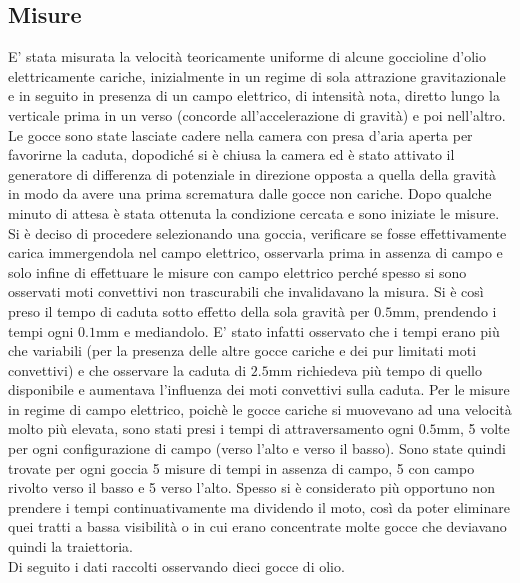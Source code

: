 \documentclass{article}
\begin{document}
\subsection{Misure}
    E' stata misurata la velocità teoricamente uniforme di alcune goccioline d’olio elettricamente cariche, inizialmente in un regime di sola attrazione gravitazionale e in seguito in presenza di un campo elettrico, di intensità nota, diretto lungo la verticale prima in un verso (concorde all'accelerazione di gravità) e poi nell'altro. \\
    Le gocce sono state lasciate cadere nella camera con presa d'aria aperta per favorirne la caduta, dopodiché si è chiusa la camera ed è stato attivato il generatore di differenza di potenziale in direzione opposta a quella della gravità in modo da avere una prima scrematura dalle gocce non cariche. Dopo qualche minuto di attesa è stata ottenuta la condizione cercata e sono iniziate le misure. \\
    Si è deciso di procedere selezionando una goccia, verificare se fosse effettivamente carica immergendola nel campo elettrico, osservarla prima in assenza di campo e solo infine di effettuare le misure con campo elettrico perché spesso si sono osservati moti convettivi non trascurabili che invalidavano la misura. Si è così preso il tempo di caduta sotto effetto della sola gravità per $0.5$mm, prendendo i tempi ogni $0.1$mm e mediandolo. E' stato infatti osservato che i tempi erano più che variabili (per la presenza delle altre gocce cariche e dei pur limitati moti convettivi) e che osservare la caduta di $2.5$mm richiedeva più tempo di quello disponibile e aumentava l'influenza dei moti convettivi sulla caduta. Per le misure in regime di campo elettrico, poichè le gocce cariche si muovevano ad una velocità molto più elevata, sono stati presi i tempi di attraversamento ogni $0.5$mm, 5 volte per ogni configurazione di campo (verso l'alto e verso il basso).
    Sono state quindi trovate per ogni goccia 5 misure di tempi in assenza di campo, 5 con campo rivolto verso il basso e 5 verso l'alto. Spesso si è considerato più opportuno non prendere i tempi continuativamente ma dividendo il moto, così da poter eliminare quei tratti a bassa visibilità o in cui erano concentrate molte gocce che deviavano quindi la traiettoria.\\
    Di seguito i dati raccolti osservando dieci gocce di olio. 

    
   
\end{document}
